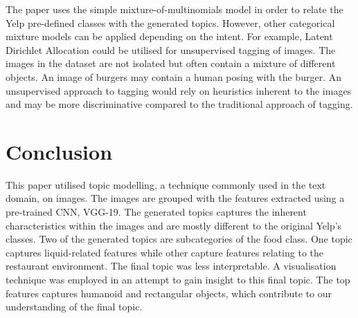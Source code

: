 \documentclass{article}
\begin{document}
The paper uses the simple mixture-of-multinomials model in order to relate the Yelp pre-defined classes with the generated topics. However, other categorical mixture models can be applied depending on the intent. For example, Latent Dirichlet Allocation could be utilised for unsupervised tagging of images. The images in the dataset are not isolated but often contain a mixture of different objects. An image of burgers may contain a human posing with the burger. An unsupervised approach to tagging would rely on heuristics inherent to the images and may be more discriminative compared to the traditional approach of tagging. 

\section{Conclusion}
This paper utilised topic modelling, a technique commonly used in the text domain, on images. The images are grouped with the features extracted using a pre-trained CNN, VGG-19. The generated topics captures the inherent characteristics within the images and are mostly different to the original Yelp's classes. Two of the generated topics are subcategories of the food class. One topic captures liquid-related features while other capture features relating to the restaurant environment. The final topic was less interpretable. A visualisation technique was employed in an attempt to gain insight to this final topic. The top features captures humanoid and rectangular objects, which contribute to our understanding of the final topic.



\end{document}
